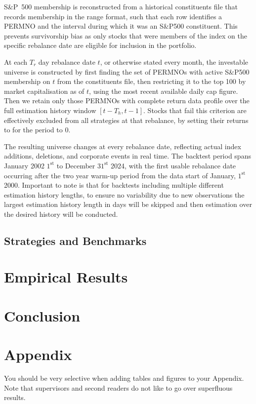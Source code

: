 \documentclass[12pt]{article}
\begin{document}
S\&P~500 membership is reconstructed from a historical constituents file that records membership in the range format, such that each row identifies a PERMNO and the interval during which it was an S\&P500 constituent. This prevents survivorship bias as only stocks that were members of the index on the specific rebalance date are eligible for inclusion in the portfolio.

At each $T_r$ day rebalance date $t$, or otherwise stated every month, the investable universe is constructed by first finding the set of PERMNOs with active S\&P500 membership on $t$ from the constituents file, then restricting it to the top 100 by market capitalisation as of $t$, using the most recent available daily cap figure. Then we retain only those PERMNOs with complete return data profile over the full estimation history window $[t - T_{h}, t - 1]$. Stocks that fail this criterion are effectively excluded from all strategies at that rebalance, by setting their returns to for the period to $0$. 

The resulting universe changes at every rebalance date, reflecting actual index additions, deletions, and corporate events in real time. The backtest period spans January 2002 $1^{\text{st}}$ to December $31^{\text{st}}$ 2024, with the first usable rebalance date occurring after the two year warm-up period from the data start of January, $1^{\text{st}}$ 2000. Important to note is that for backtests including multiple different estimation history lengths, to ensure no variability due to new observations the largest estimation history length in days will be skipped and then estimation over the desired history will be conducted.

\subsection{Strategies and Benchmarks}

\section{Empirical Results}
\label{sec:empirical-results}


\section{Conclusion}
\label{sec:conc}





\newpage
\section{Appendix}
You should be very selective when adding tables and figures to your Appendix. Note that supervisors and second readers do not like to go over superfluous results.
\end{document}

